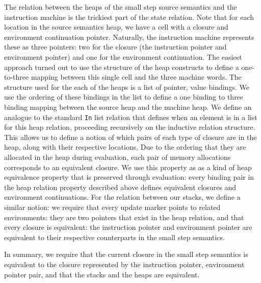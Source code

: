 The relation between the heaps of the small step source semantics and the
instruction machine is the trickiest part of the state relation. Note that for
each location in the source semantics heap, we have a cell with a closure and
environment continuation pointer. Naturally, the instruction machine represents
these as three pointers: two for the closure (the instruction pointer and
environment pointer) and one for the environment continuation. The easiest
approach turned out to use the structure of the heap constructs to define a
one-to-three mapping between this single cell and the three machine words. The
structure used for the each of the heaps is a list of pointer, value bindings.
We use the ordering of these bindings in the list to define a one binding to
three binding mapping between the source heap and the machine heap. We define an
analogue to the standard \texttt{In} list relation that defines when an element
is in a list for this heap relation, proceeding recursively on the inductive
relation structure. This allows us to define a notion of which pairs of each
type of closure are in the heap, along with their respective locations. Due to
the ordering that they are allocated in the heap during evaluation, each pair of
memory allocations corresponds to an equivalent closure. We use this property as
as a kind of heap equivalence property that is preserved through evaluation:
every binding pair in the heap relation property described above defines
equivalent closures and environment continuations. For the relation between our
stacks, we define a similar notion: we require that every update marker points
to related environments: they are two pointers that exist in the heap relation,
and that every closure is equivalent: the instruction pointer and environment
pointer are equivalent to their respective counterparts in the small step
semantics. 

In summary, we require that the current closure in the small step semantics is
equivalent to the closure represented by the instruction pointer, environment
pointer pair, and that the stacks and the heaps are equivalent.  

